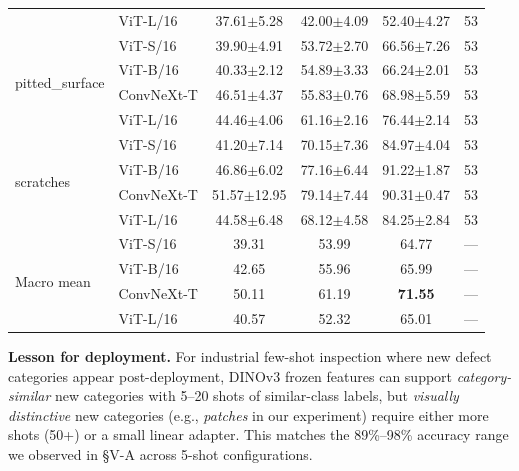\documentclass[journal]{IEEEtran}
\begin{document}
\begin{table}[!ht]
\begin{tabular}{llcccc}
                              & ViT-L/16     & 37.61$\pm$5.28 & 42.00$\pm$4.09 & 52.40$\pm$4.27 & 53 \\
\multirow{4}{*}{pitted\_surface} & ViT-S/16     & 39.90$\pm$4.91 & 53.72$\pm$2.70 & 66.56$\pm$7.26 & 53 \\
                                & ViT-B/16     & 40.33$\pm$2.12 & 54.89$\pm$3.33 & 66.24$\pm$2.01 & 53 \\
                                & ConvNeXt-T   & 46.51$\pm$4.37 & 55.83$\pm$0.76 & 68.98$\pm$5.59 & 53 \\
                                & ViT-L/16     & 44.46$\pm$4.06 & 61.16$\pm$2.16 & 76.44$\pm$2.14 & 53 \\
\multirow{4}{*}{scratches}     & ViT-S/16     & 41.20$\pm$7.14 & 70.15$\pm$7.36 & 84.97$\pm$4.04 & 53 \\
                              & ViT-B/16     & 46.86$\pm$6.02 & 77.16$\pm$6.44 & 91.22$\pm$1.87 & 53 \\
                              & ConvNeXt-T   & 51.57$\pm$12.95 & 79.14$\pm$7.44 & 90.31$\pm$0.47 & 53 \\
                              & ViT-L/16     & 44.58$\pm$6.48 & 68.12$\pm$4.58 & 84.25$\pm$2.84 & 53 \\
\midrule
\multirow{4}{*}{Macro mean}    & ViT-S/16     & 39.31 & 53.99 & 64.77 & --- \\
                              & ViT-B/16     & 42.65 & 55.96 & 65.99 & --- \\
                              & ConvNeXt-T   & 50.11 & 61.19 & \textbf{71.55} & --- \\
                              & ViT-L/16     & 40.57 & 52.32 & 65.01 & --- \\
\bottomrule
\end{tabular}
\end{table}

\textbf{Lesson for deployment.} For industrial few-shot inspection where new defect categories appear post-deployment, DINOv3 frozen features can support \emph{category-similar} new categories with 5--20 shots of similar-class labels, but \emph{visually distinctive} new categories (e.g., \emph{patches} in our experiment) require either more shots (50+) or a small linear adapter. This matches the 89\%--98\% accuracy range we observed in \S V-A across 5-shot configurations.
\end{document}
